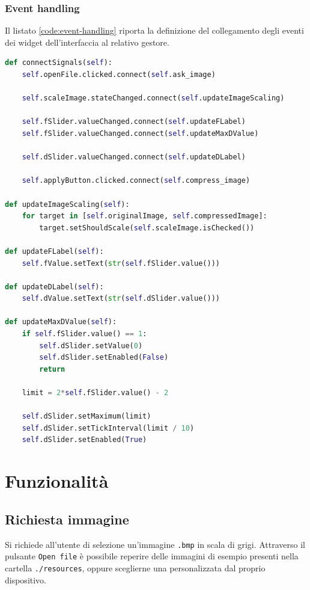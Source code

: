 \documentclass[11pt,italian]{article}
\begin{document}
\subsubsection*{Event handling}
Il listato \cref{code:event-handling} riporta la definizione del collegamento degli eventi dei widget dell'interfaccia al relativo gestore.
\begin{lstlisting}[language=Python,emph={self},label=code:event-handling,caption=Event-handling dei segnali dei widget]
def connectSignals(self):
    self.openFile.clicked.connect(self.ask_image)

    self.scaleImage.stateChanged.connect(self.updateImageScaling)

    self.fSlider.valueChanged.connect(self.updateFLabel)
    self.fSlider.valueChanged.connect(self.updateMaxDValue)

    self.dSlider.valueChanged.connect(self.updateDLabel)

    self.applyButton.clicked.connect(self.compress_image)

def updateImageScaling(self):
    for target in [self.originalImage, self.compressedImage]:
        target.setShouldScale(self.scaleImage.isChecked())

def updateFLabel(self):
    self.fValue.setText(str(self.fSlider.value()))

def updateDLabel(self):
    self.dValue.setText(str(self.dSlider.value()))

def updateMaxDValue(self):
    if self.fSlider.value() == 1:
        self.dSlider.setValue(0)
        self.dSlider.setEnabled(False)
        return

    limit = 2*self.fSlider.value() - 2

    self.dSlider.setMaximum(limit)
    self.dSlider.setTickInterval(limit / 10)
    self.dSlider.setEnabled(True)
\end{lstlisting}

\newpage
\section{Funzionalità}
\subsection{Richiesta immagine}
Si richiede all’utente di selezione un'immagine \lstinline{.bmp} in scala di grigi. Attraverso il pulsante \lstinline{Open file} è possibile reperire delle immagini di esempio presenti nella cartella \lstinline{./resources}, oppure sceglierne una personalizzata dal proprio dispositivo.
\end{document}
